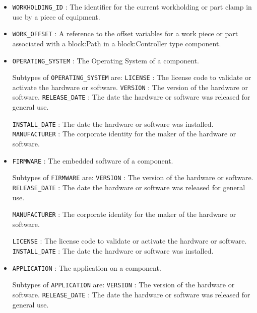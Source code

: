 \begin{itemize}
\item \texttt{WORKHOLDING_ID} : The identifier for the current workholding or part clamp in use by a piece of equipment. 

\item \texttt{WORK_OFFSET} : A reference to the offset variables for a work piece or part associated with a {block:Path} in a {block:Controller} type component. 

\item \texttt{OPERATING_SYSTEM} : The Operating System of a component. 

Subtypes of \texttt{OPERATING_SYSTEM} are: 
\newline\tab \texttt{LICENSE} : The license code to validate or activate the hardware or software. 
\newline\tab \texttt{VERSION} : The version of the hardware or software. 
\newline\tab \texttt{RELEASE_DATE} : The date the hardware or software was released for general use.
 
\newline\tab \texttt{INSTALL_DATE} : The date the hardware or software was installed. 
\newline\tab \texttt{MANUFACTURER} : The corporate identity for the maker of the hardware or software.
 
\item \texttt{FIRMWARE} : The embedded software of a component.
 

Subtypes of \texttt{FIRMWARE} are: 
\newline\tab \texttt{VERSION} : The version of the hardware or software. 
\newline\tab \texttt{RELEASE_DATE} : The date the hardware or software was released for general use.
 
\newline\tab \texttt{MANUFACTURER} : The corporate identity for the maker of the hardware or software.
 
\newline\tab \texttt{LICENSE} : The license code to validate or activate the hardware or software. 
\newline\tab \texttt{INSTALL_DATE} : The date the hardware or software was installed. 
\item \texttt{APPLICATION} : The application on a component. 

Subtypes of \texttt{APPLICATION} are: 
\newline\tab \texttt{VERSION} : The version of the hardware or software. 
\newline\tab \texttt{RELEASE_DATE} : The date the hardware or software was released for general use.
 

\end{itemize}
